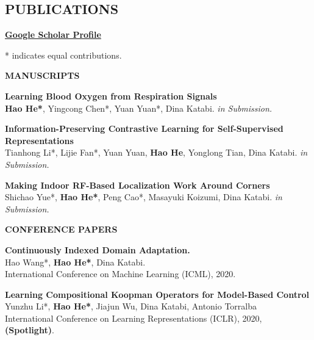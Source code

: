 \documentclass[margin]{res}
\newcommand{\Bullet}[1]{{\raisebox{0.25ex}{\tiny$\bullet$\ }}{#1}\\}
\begin{document}
\begin{resume}

\section{PUBLICATIONS}
\href{https://scholar.google.com/citations?user=v1sUoqwAAAAJ&hl=en&oi=ao}{\textbf{Google Scholar Profile}}

\small{* indicates equal contributions.}

\textbf{MANUSCRIPTS}

\textbf{Learning Blood Oxygen from Respiration Signals}\\
\textbf{Hao He*}, Yingcong Chen*, Yuan Yuan*, Dina Katabi. \emph{in Submission.}

\small{\textbf{Information-Preserving Contrastive Learning for Self-Supervised Representations}}\\
Tianhong Li*, Lijie Fan*, Yuan Yuan, \textbf{Hao He}, Yonglong Tian, Dina Katabi. \emph{in Submission.}

\textbf{Making Indoor RF-Based Localization Work Around Corners}\\
Shichao Yue*, \textbf{Hao He*}, Peng Cao*, Masayuki Koizumi, Dina Katabi. \emph{in Submission.}

\textbf{CONFERENCE PAPERS}

\textbf{Continuously Indexed Domain Adaptation.}\\
Hao Wang*, \textbf{Hao He*}, Dina Katabi.\\
International Conference on Machine Learning (ICML), 2020.

\textbf{Learning Compositional Koopman Operators for Model-Based Control}\\
Yunzhu Li*, \textbf{Hao He*}, Jiajun Wu, Dina Katabi, Antonio Torralba\\
International Conference on Learning Representations (ICLR), 2020, \textbf{(Spotlight)}.


\end{resume}
\end{document}
